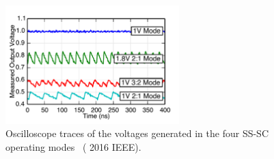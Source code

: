 \documentclass[graybox]{svmult}
\begin{document}
\begin{figure}
  \centering
  \includegraphics[width=0.6\textwidth]{6-raven3-dcdc-waveforms}
  \caption{Oscilloscope traces of the voltages generated in the four SS-SC operating modes~\cite{Zimmer2016} ({\textcopyright} 2016 IEEE).}
  \label{fig:6-raven3-dcdc-waveforms}
\end{figure}
\end{document}
